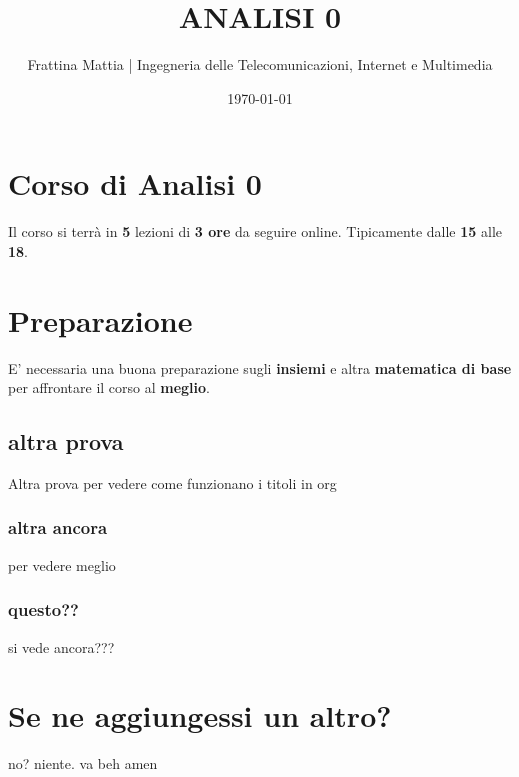 \documentclass[11pt]{article}
\author{Frattina Mattia | Ingegneria delle Telecomunicazioni, Internet e Multimedia}
\date{\today}
\title{ANALISI 0}
\begin{document}
\maketitle
\tableofcontents

\section{Corso di Analisi 0}
\label{sec:org0c985c2}
Il corso si terrà in \textbf{5} lezioni di \textbf{3 ore} da seguire online. Tipicamente dalle \textbf{15} alle \textbf{18}.
\section{Preparazione}
\label{sec:org756be9b}
E' necessaria una buona preparazione sugli \textbf{insiemi} e altra \textbf{matematica di base} per affrontare il corso al \textbf{meglio}.
\subsection{altra prova}
\label{sec:org63b1ee7}
Altra prova per vedere come funzionano i titoli in org
\subsubsection{altra ancora}
\label{sec:orgaf744f5}
per vedere meglio
\subsubsection{questo??}
\label{sec:orgb79070f}
si vede ancora???
\section{Se ne aggiungessi un altro?}
\label{sec:org2775fa5}
no? niente. va beh amen
\end{document}
